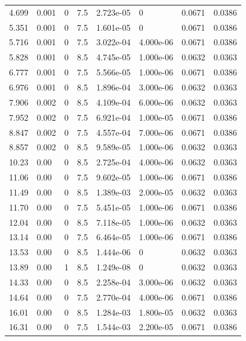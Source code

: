 \documentclass[preview]{standalone}
\begin{document}
{{\begin{tabular}{L{1.2cm}C{1.2cm} C{0.3cm}C{0.5cm} C{1.4cm}C{1.4cm} C{1.4cm}C{1.4cm}}
  4.699  &  0.001  & 0     & 7.5 &  2.723e-05  & 0  & 0.0671 &  0.0386   \\ 
  5.351  &  0.001  & 0     & 7.5 &  1.601e-05  & 0  & 0.0671 &  0.0386   \\ 
  5.716  &  0.001  & 0     & 7.5 &  3.022e-04  & 4.000e-06  & 0.0671 &  0.0386   \\ 
  5.828  &  0.001  & 0     & 8.5 &  4.745e-05  & 1.000e-06  & 0.0632 &  0.0363   \\ 
  6.777  &  0.001  & 0     & 7.5 &  5.566e-05  & 1.000e-06  & 0.0671 &  0.0386   \\ 
  6.976  &  0.001  & 0     & 8.5 &  1.896e-04  & 3.000e-06  & 0.0632 &  0.0363   \\ 
  7.906  &  0.002  & 0     & 8.5 &  4.109e-04  & 6.000e-06  & 0.0632 &  0.0363   \\ 
  7.952  &  0.002  & 0     & 7.5 &  6.921e-04  & 1.000e-05  & 0.0671 &  0.0386   \\ 
  8.847  &  0.002  & 0     & 7.5 &  4.557e-04  & 7.000e-06  & 0.0671 &  0.0386   \\ 
  8.857  &  0.002  & 0     & 8.5 &  9.589e-05  & 1.000e-06  & 0.0632 &  0.0363   \\ 
  10.23  &  0.00  & 0     & 8.5 &  2.725e-04  & 4.000e-06  & 0.0632 &  0.0363   \\ 
  11.06  &  0.00  & 0     & 7.5 &  9.602e-05  & 1.000e-06  & 0.0671 &  0.0386   \\ 
  11.49  &  0.00  & 0     & 8.5 &  1.389e-03  & 2.000e-05  & 0.0632 &  0.0363   \\ 
  11.70  &  0.00  & 0     & 7.5 &  5.451e-05  & 1.000e-06  & 0.0671 &  0.0386   \\ 
  12.04  &  0.00  & 0     & 8.5 &  7.118e-05  & 1.000e-06  & 0.0632 &  0.0363   \\ 
  13.14  &  0.00  & 0     & 7.5 &  6.464e-05  & 1.000e-06  & 0.0671 &  0.0386   \\ 
  13.53  &  0.00  & 0     & 8.5 &  1.444e-06  & 0  & 0.0632 &  0.0363   \\ 
  13.89  &  0.00  & 1     & 8.5 &  1.249e-08  & 0  & 0.0632 &  0.0363   \\ 
  14.33  &  0.00  & 0     & 8.5 &  2.258e-04  & 3.000e-06  & 0.0632 &  0.0363   \\ 
  14.64  &  0.00  & 0     & 7.5 &  2.770e-04  & 4.000e-06  & 0.0671 &  0.0386   \\ 
  16.01  &  0.00  & 0     & 8.5 &  1.284e-03  & 1.800e-05  & 0.0632 &  0.0363   \\ 
  16.31  &  0.00  & 0     & 7.5 &  1.544e-03  & 2.200e-05  & 0.0671 &  0.0386   \\ 

\end{tabular}}}
\end{document}
